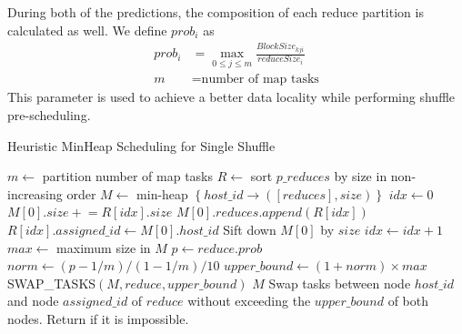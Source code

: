 During both of the predictions, the composition of each reduce partition is calculated as well. We define $prob_i$ as
\begin{equation}
\label{equationprob}
\begin{aligned}
	prob_i &= \max_{0 \leq j \leq m} \frac{BlockSize_{kji}}{reduceSize_i} \\
    m &= \text{number of map tasks}
\end{aligned}
\end{equation}
This parameter is used to achieve a better data locality while performing shuffle pre-scheduling. 

\begin{minipage}{0.95\columnwidth}
\begin{algorithm}[H]
\caption{Heuristic MinHeap Scheduling for Single Shuffle}
\label{hminheap}
	\begin{algorithmic}[1]
	\small
		\State $m\gets$ partition number of map tasks
		\State $R\gets$ sort $p\_reduces$ by size in non-increasing order
		\State $M\gets$ min-heap $\left\{ host\_id \rightarrow \left( \left[ reduces \right], size \right) \right\}$
		\State $idx\gets 0$
		\State $M\left[0\right].size \mathrel{+}= R\left[idx\right].size$
		\State $M\left[0\right].reduces.append\left(R\left[idx\right]\right)$
		\State $R\left[idx\right].assigned\_id \gets M \left[0\right].host\_id$
		\State Sift down $M\left[0\right]$ by $size$
		\State $idx\gets idx+1$
		\EndWhile
		\State $max\gets$ maximum size in $M$
				\State $p\gets reduce.prob$
				\State $norm\gets \left(p-1/m\right)/\left(1-1/m\right)/10$
				\State $upper\_bound \gets \left(1 + norm\right) \times max$
				\State SWAP\_TASKS$\left(M, reduce, upper\_bound\right)$
			\EndIf
		\EndFor
		\Return $M$
	\EndProcedure
		\State Swap tasks between node $host\_id$ and node $assigned\_id$
		\State of $reduce$ without exceeding the $upper\_bound$
		\State of both nodes.
		\State Return if it is impossible.
	\EndProcedure
	\end{algorithmic}
\end{algorithm}
\end{minipage}

